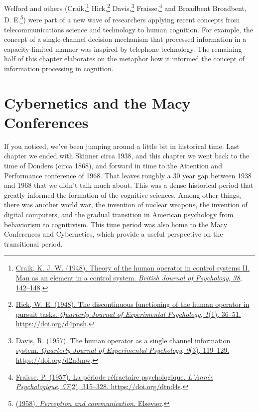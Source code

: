 \documentclass[
  oneside,
  12pt]{crumpbook}
\begin{document}
Welford and others (Craik,\footnote{\protect\hyperlink{ref-craikTheoryHumanOperator1948}{Craik, K. J. W. (1948). Theory of the human operator in control systems {II}. {Man} as an element in a control system. \emph{British Journal of Psychology}, \emph{38}, 142--148}.} Hick,\footnote{\protect\hyperlink{ref-hickDiscontinuousFunctioningHuman1948}{Hick, W. E. (1948). The discontinuous functioning of the human operator in pursuit tasks. \emph{Quarterly Journal of Experimental Psychology}, \emph{1}(1), 36--51. \url{https://doi.org/d4pnsh}}.} Davis,\footnote{\protect\hyperlink{ref-davisHumanOperatorSingle1957}{Davis, R. (1957). The human operator as a single channel information system. \emph{Quarterly Journal of Experimental Psychology}, \emph{9}(3), 119--129. \url{https://doi.org/d2n3mw}}.} Fraisse,\footnote{\protect\hyperlink{ref-fraissePeriodeRefractairePsychologique1957}{Fraisse, P. (1957). La période réfractaire psychologique. \emph{L'Année Psychologique}, \emph{57}(2), 315--328. \url{https://doi.org/dtnd4s}}.} and Broadbent Broadbent, D. E.\footnote{\protect\hyperlink{ref-broadbentPerceptionCommunication1958}{(1958). \emph{Perception and communication}. {Elsevier}}.}) were part of a new wave of researchers applying recent concepts from telecommunications science and technology to human cognition. For example, the concept of a single-channel decision mechanism that processed information in a capacity limited manner was inspired by telephone technology. The remaining half of this chapter elaborates on the metaphor how it informed the concept of information processing in cognition.

\hypertarget{cybernetics-and-the-macy-conferences}{%
\section{Cybernetics and the Macy Conferences}\label{cybernetics-and-the-macy-conferences}}

If you noticed, we've been jumping around a little bit in historical time. Last chapter we ended with Skinner circa 1938, and this chapter we went back to the time of Donders (circa 1868), and forward in time to the Attention and Performance conference of 1968. That leaves roughly a 30 year gap between 1938 and 1968 that we didn't talk much about. This was a dense historical period that greatly informed the formation of the cognitive sciences. Among other things, there was another world war, the invention of nuclear weapons, the invention of digital computers, and the gradual transition in American psychology from behaviorism to cognitivism. This time period was also home to the Macy Conferences and Cybernetics, which provide a useful perspective on the transitional period.
\end{document}
